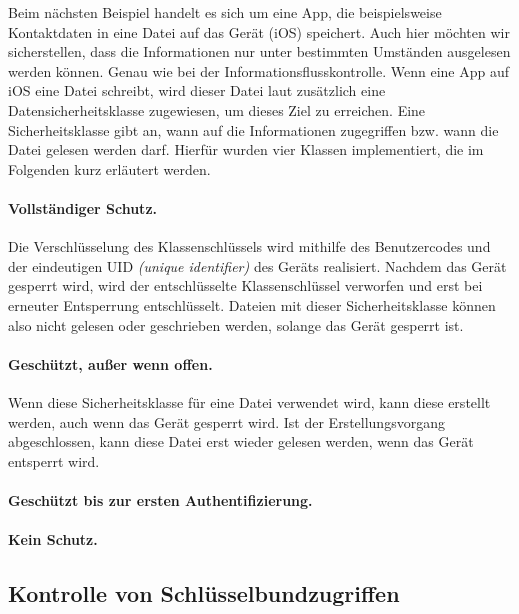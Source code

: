 Beim nächsten Beispiel handelt es sich um eine App, die beispielsweise
Kontaktdaten in eine Datei auf das Gerät (iOS) speichert. Auch hier möchten wir
sicherstellen, dass die Informationen nur unter bestimmten Umständen ausgelesen
werden können.  Genau wie bei der Informationsflusskontrolle. Wenn eine App auf
iOS eine Datei schreibt, wird dieser Datei laut \cite{appledev,apple2020}
zusätzlich eine Datensicherheitsklasse zugewiesen, um dieses Ziel zu erreichen.
Eine Sicherheitsklasse gibt an, wann auf die Informationen zugegriffen bzw.
wann die Datei gelesen werden darf. Hierfür wurden vier Klassen implementiert,
die im Folgenden kurz erläutert werden.

\paragraph{Vollständiger Schutz.}{Die Verschlüsselung des Klassenschlüssels wird
mithilfe des Benutzercodes und der eindeutigen UID \textit{(unique identifier)}
des Geräts realisiert. Nachdem das Gerät gesperrt wird, wird der entschlüsselte
Klassenschlüssel verworfen und erst bei erneuter Entsperrung entschlüsselt.
Dateien mit dieser Sicherheitsklasse können also nicht gelesen oder geschrieben
werden, solange das Gerät gesperrt ist.}

\paragraph{Geschützt, außer wenn offen.}{Wenn diese Sicherheitsklasse für eine
Datei verwendet wird, kann diese erstellt werden, auch wenn das Gerät gesperrt
wird. Ist der Erstellungsvorgang abgeschlossen, kann diese Datei erst wieder
gelesen werden, wenn das Gerät entsperrt wird.}

\paragraph{Geschützt bis zur ersten Authentifizierung.}{}

\paragraph{Kein Schutz.}{}

\subsection{Kontrolle von Schlüsselbundzugriffen}
